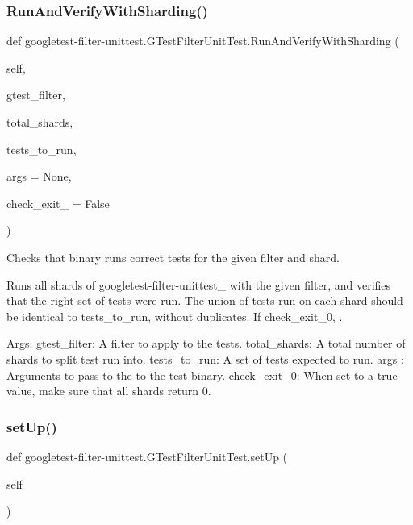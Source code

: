 \subsubsection{\texorpdfstring{RunAndVerifyWithSharding()}{RunAndVerifyWithSharding()}}
{\footnotesize\ttfamily def googletest-\/filter-\/unittest.\+G\+Test\+Filter\+Unit\+Test.\+Run\+And\+Verify\+With\+Sharding (\begin{DoxyParamCaption}\item[{}]{self,  }\item[{}]{gtest\+\_\+filter,  }\item[{}]{total\+\_\+shards,  }\item[{}]{tests\+\_\+to\+\_\+run,  }\item[{}]{args = {\ttfamily None},  }\item[{}]{check\+\_\+exit\+\_ = {\ttfamily False} }\end{DoxyParamCaption})}

\begin{DoxyVerb}Checks that binary runs correct tests for the given filter and shard.

Runs all shards of googletest-filter-unittest_ with the given filter, and
verifies that the right set of tests were run. The union of tests run
on each shard should be identical to tests_to_run, without duplicates.
If check_exit_0, .

Args:
  gtest_filter: A filter to apply to the tests.
  total_shards: A total number of shards to split test run into.
  tests_to_run: A set of tests expected to run.
  args   :      Arguments to pass to the to the test binary.
  check_exit_0: When set to a true value, make sure that all shards
            return 0.
\end{DoxyVerb}
 \mbox{\label{classgoogletest-filter-unittest_1_1_g_test_filter_unit_test_a5aedf9d24243167acee87c9ddba82cc7}} 
\subsubsection{\texorpdfstring{setUp()}{setUp()}}
{\footnotesize\ttfamily def googletest-\/filter-\/unittest.\+G\+Test\+Filter\+Unit\+Test.\+set\+Up (\begin{DoxyParamCaption}\item[{}]{self }\end{DoxyParamCaption})}

